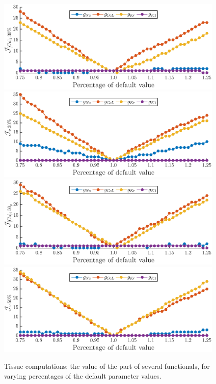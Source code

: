 \documentclass{article}
\begin{document}
\begin{figure}
\includegraphics[trim=0cm 0cm 0cm 0.5cm, clip=true, width=1\linewidth]{J_ca30} 
\includegraphics[trim=0cm 0cm 0cm 0.5cm, clip=true, width=1\linewidth]{J_v30} 
\includegraphics[trim=0cm 0cm 0cm 0.5cm, clip=true, width=1\linewidth]{J_ca50} 
\includegraphics[trim=0cm 0cm 0cm 0.5cm, clip=true, width=1\linewidth]{J_v50} 
    \caption{Tissue computations: the value of the part of several functionals, for varying percentages of the default parameter values.}
    \label{fig:9b}
\end{figure}
\end{document}
